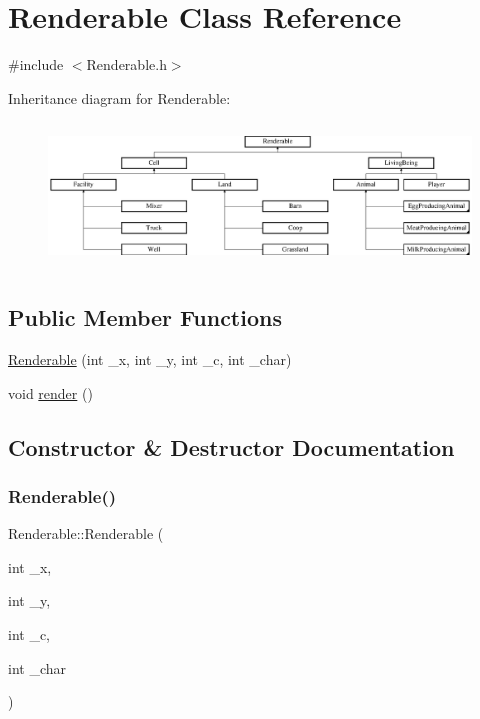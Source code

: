 \hypertarget{classRenderable}{}\section{Renderable Class Reference}
\label{classRenderable}


{\ttfamily \#include $<$Renderable.\+h$>$}

Inheritance diagram for Renderable\+:\begin{figure}[H]
\begin{center}
\leavevmode
\includegraphics[height=3.888889cm]{classRenderable}
\end{center}
\end{figure}
\subsection*{Public Member Functions}
\begin{DoxyCompactItemize}
\item 
\mbox{\hyperlink{classRenderable_a365e3f43ad3087bd2d527db4cb47f917}{Renderable}} (int \+\_\+x, int \+\_\+y, int \+\_\+c, int \+\_\+char)
\item 
void \mbox{\hyperlink{classRenderable_a1dce45c4703b60fd30acf824c77df9b6}{render}} ()
\end{DoxyCompactItemize}


\subsection{Constructor \& Destructor Documentation}
\mbox{\label{classRenderable_a365e3f43ad3087bd2d527db4cb47f917}} 
\subsubsection{\texorpdfstring{Renderable()}{Renderable()}}
{\footnotesize\ttfamily Renderable\+::\+Renderable (\begin{DoxyParamCaption}\item[{int}]{\+\_\+x,  }\item[{int}]{\+\_\+y,  }\item[{int}]{\+\_\+c,  }\item[{int}]{\+\_\+char }\end{DoxyParamCaption})}



